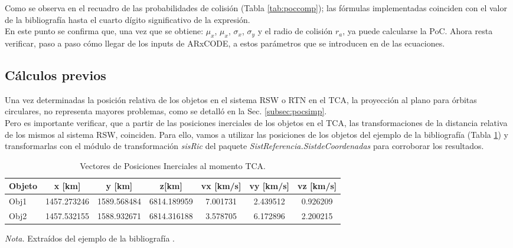 \vspace{0.5cm}
Como se observa en el recuadro de las probabilidades de colisi\'on (Tabla \ref{tab:poccomp}); las f\'ormulas implementadas coinciden con el valor de la bibliograf\'ia hasta el cuarto d\'igito significativo de la expresi\'on.\\

En este punto se confirma que, una vez que se obtiene: $\mu_{x}$, $\mu_{x}$, $\sigma_{x}$, $\sigma_{y}$ y el radio de colisi\'on $r_{a}$, ya puede calcularse la PoC. 
Ahora resta verificar, paso a paso c\'omo llegar de los inputs de ARxCODE, a estos par\'ametros que se introducen en de las ecuaciones. \\

\subsection*{C\'alculos previos}

Una vez determinadas la posici\'on relativa de los objetos en el sistema RSW o RTN en el TCA, la proyecci\'on al plano para \'orbitas circulares, no representa mayores problemas, como se detall\'o en la Sec. \ref{subsec:pocsimp}.\\

Pero es importante verificar, que a partir de las posiciones inerciales de los objetos en el TCA, las transformaciones de la distancia relativa de los mismos al sistema RSW, coinciden.
Para ello, vamos a utilizar las posiciones de los objetos del ejemplo de la bibliograf\'ia (Tabla \ref{tab:vectejemplo}) y transformarlas con el m\'odulo de transformaci\'on {\it{sisRic}} del paquete {\it{SistReferencia.SistdeCoordenadas}} para corroborar los resultados.
\\

\begin{table}[!h]
\caption{Vectores de Posiciones Inerciales al momento TCA.}
\begin{tabular}{lcccccc}
\hline
Objeto & x [km] & y [km] &z[km] &vx [km/s] &vy [km/s] &vz [km/s]\\
\hline
Obj1 & 1457.273246 &1589.568484&6814.189959&7.001731&2.439512&0.926209\\
Obj2 & 1457.532155&1588.932671&6814.316188&3.578705&6.172896&2.200215\\
\hline
\end{tabular}
\label{tab:vectejemplo}
\begin{flushleft}
\small {\it{Nota.}} Extra\'idos del ejemplo de la bibliograf\'ia \citep{leichen}.
\end{flushleft}
\end{table}

